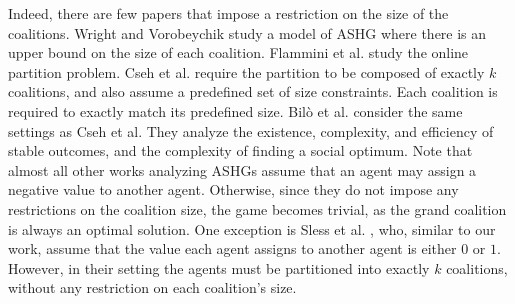 \documentclass[sigconf]{aamas}
\begin{document}
Indeed, there are few papers that impose a restriction on the size of the coalitions. 
Wright and Vorobeychik \cite{wright2015mechanism} study a model of ASHG where there is an upper bound on the size of
each coalition. %
Flammini et al. \cite{flammini2021online} study the online partition problem. %
Cseh et al. \cite{cseh2019pareto} require the partition to be composed of exactly $k$ coalitions, and also assume a predefined set of size constraints. Each coalition is required to exactly match its predefined size. %
Bilò et al. \cite{bilo2022hedonic} consider the same settings as Cseh et al.
They analyze the existence, complexity, and efficiency of stable outcomes, and the complexity of finding a social optimum.
%
Note that almost all other works analyzing ASHGs assume that an agent may assign a negative value to another agent. Otherwise, since they do not impose any restrictions on the coalition size, the game becomes trivial, as the grand coalition is always an optimal solution. One exception is Sless et al. , who, similar to our work, assume that the value each agent assigns to another agent is either $0$ or $1$. However, in their setting the agents must be partitioned into exactly $k$ coalitions, without any restriction on each coalition's size.
\end{document}
